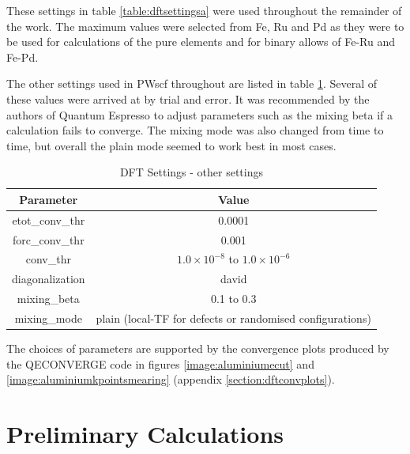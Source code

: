 These settings in table \ref{table:dftsettingsa} were used throughout the remainder of the work.  The maximum values were selected from Fe, Ru and Pd as they were to be used for calculations of the pure elements and for binary allows of Fe-Ru and Fe-Pd.

The other settings used in PWscf throughout are listed in table \ref{table:dftsettingsb}.  Several of these values were arrived at by trial and error.  It was recommended by the authors of Quantum Espresso to adjust parameters such as the mixing beta if a calculation fails to converge.  The mixing mode was also changed from time to time, but overall the plain mode seemed to work best in most cases.

\begin{table}[h]
\begin{center}
\renewcommand{\arraystretch}{1.2}
\begin{tabular}{c c}
\hline\hline
Parameter & Value \\
\hline\hline
etot\_conv\_thr & 0.0001 \\
forc\_conv\_thr & 0.001 \\ 
conv\_thr & $1.0 \times 10^{-8}$ to $1.0 \times 10^{-6}$ \\ 
diagonalization & david \\ 
mixing\_beta & 0.1 to 0.3 \\ 
mixing\_mode & plain (local-TF for defects or randomised configurations) \\ 
\hline\hline
\end{tabular}
\end{center}
\caption{DFT Settings - other settings}
\label{table:dftsettingsb}
\end{table}

\FloatBarrier

The choices of parameters are supported by the convergence plots produced by the QECONVERGE code in figures \ref{image:aluminiumecut} and \ref{image:aluminiumkpointsmearing} (appendix \ref{section:dftconvplots}).






\FloatBarrier
\section{Preliminary Calculations}

